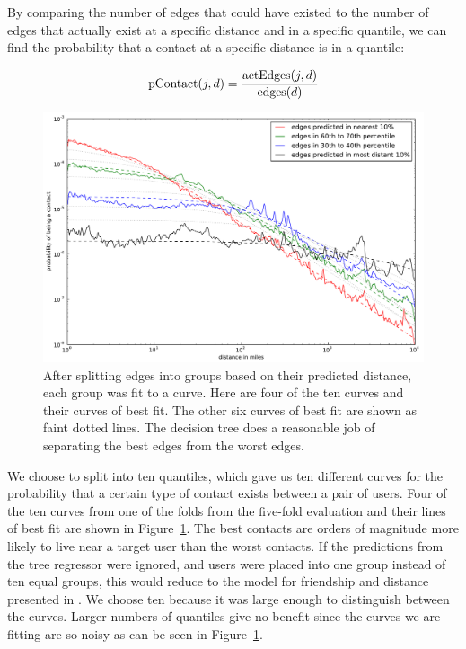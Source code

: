 By comparing the number of edges that could have existed to the number of edges
that actually exist at a specific distance and in a specific quantile, we can
find the probability that a contact at a specific distance is in a quantile:

\[
\operatorname{pContact}(j,d) = \frac{\operatorname{actEdges}(j,d)}{\operatorname{edges}(d)}
\]

\begin{figure}[tbh]
\centering
\includegraphics[width=\linewidth]{figures/vect_fit.pdf}
\caption{
After splitting edges into groups based on their predicted distance, each group
was fit to a curve. Here are four of the ten curves and their curves of best
fit. The other six curves of best fit are shown as faint dotted lines. The
decision tree does a reasonable job of separating the best edges from the worst
edges.
}
\label{fig:NearProbFit}
\end{figure}

We choose to split into ten quantiles, which gave us ten different curves for the
probability that a certain type of contact exists between a pair of users.
%
Four of the ten curves from one of the folds from the five-fold evaluation and
their lines of best fit are shown in Figure~\ref{fig:NearProbFit}.
%
The best contacts are orders of magnitude more
likely to live near a target user than the worst contacts.
%
If the predictions from the tree regressor were ignored, and users were placed
into one group instead of ten equal groups, this would reduce to the model
for friendship and distance presented in \cite{backstrom2010find}.
%
We choose ten because it was large enough to distinguish between the curves.
%
Larger numbers of quantiles give no benefit since the curves we are
fitting are so noisy as can be seen in Figure~\ref{fig:NearProbFit}.


